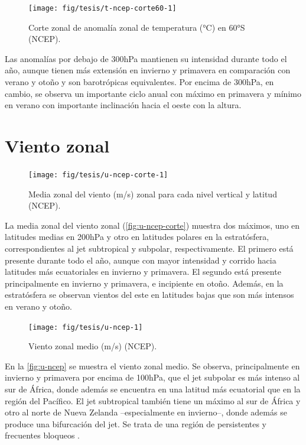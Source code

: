 \documentclass[spanish,a4paper,12pt,oneside]{book}
\begin{document}
\begin{figure}
\texttt{[image: fig/tesis/t-ncep-corte60-1]} \caption{Corte zonal de anomalía zonal de temperatura (°C) en 60°S (NCEP).}\label{fig:t-ncep-corte60}
\end{figure}

Las anomalías por debajo de 300hPa mantienen su intensidad durante todo
el año, aunque tienen más extensión en invierno y primavera en
comparación con verano y otoño y son barotrópicas equivalentes. Por
encima de 300hPa, en cambio, se observa un importante ciclo anual con
máximo en primavera y mínimo en verano con importante inclinación hacia
el oeste con la altura.

\section{Viento zonal}\label{viento-zonal}

\begin{figure}
\texttt{[image: fig/tesis/u-ncep-corte-1]} \caption{Media zonal del viento (m/s) zonal para cada nivel vertical y latitud (NCEP).}\label{fig:u-ncep-corte}
\end{figure}

La media zonal del viento zonal (\autoref{fig:u-ncep-corte}) muestra dos
máximos, uno en latitudes medias en 200hPa y otro en latitudes polares
en la estratósfera, correspondientes al jet subtropical y subpolar,
respectivamente. El primero está presente durante todo el año, aunque
con mayor intensidad y corrido hacia latitudes más ecuatoriales en
invierno y primavera. El segundo está presente principalmente en
invierno y primavera, e incipiente en otoño. Además, en la estratósfera
se observan vientos del este en latitudes bajas que son más intensos en
verano y otoño.

\begin{landscape}\begin{figure}

{\centering \texttt{[image: fig/tesis/u-ncep-1]} 

}

\caption{Viento zonal medio (m/s) (NCEP).}\label{fig:u-ncep}
\end{figure}
\end{landscape}

En la \autoref{fig:u-ncep} se muestra el viento zonal medio. Se observa,
principalmente en invierno y primavera por encima de 100hPa, que el jet
subpolar es más intenso al sur de África, donde además se encuentra en
una latitud más ecuatorial que en la región del Pacífico. El jet
subtropical también tiene un máximo al sur de África y otro al norte de
Nueva Zelanda --especialmente en invierno--, donde además se produce una
bifurcación del jet. Se trata de una región de persistentes y frecuentes
bloqueos \autocite[ej.][]{Trenberth1985}.
\end{document}
